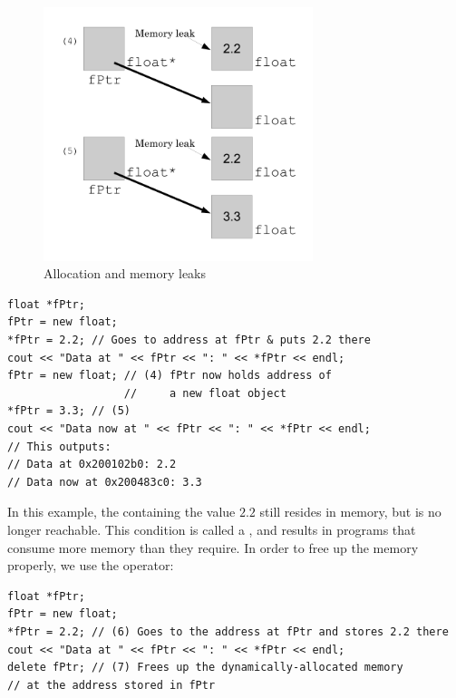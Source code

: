 \begin{figure}[tbh]
  \centering
  \includegraphics[width=0.7\textwidth]{diagrams/new_operator_diagram_2.pdf}
  \caption{Allocation and memory leaks} \label{fig:new_operator_diagram_2} 
\end{figure}

\noindent\begin{minipage}{\linewidth}\begin{lstlisting}
float *fPtr;
fPtr = new float;
*fPtr = 2.2; // Goes to address at fPtr & puts 2.2 there
cout << "Data at " << fPtr << ": " << *fPtr << endl;
fPtr = new float; // (4) fPtr now holds address of 
                  //     a new float object
*fPtr = 3.3; // (5)
cout << "Data now at " << fPtr << ": " << *fPtr << endl;
// This outputs: 
// Data at 0x200102b0: 2.2
// Data now at 0x200483c0: 3.3
\end{lstlisting}\end{minipage}

In this example, the  containing the value $2.2$ still resides in memory, but is no longer reachable. 
This condition is called a , and results in programs that consume more memory than they require. 
In order to free up the memory properly, we use the  operator: \nopagebreak[4]

\noindent\begin{minipage}{\linewidth}\begin{lstlisting}
float *fPtr;
fPtr = new float;
*fPtr = 2.2; // (6) Goes to the address at fPtr and stores 2.2 there
cout << "Data at " << fPtr << ": " << *fPtr << endl;
delete fPtr; // (7) Frees up the dynamically-allocated memory 
// at the address stored in fPtr
\end{lstlisting}\end{minipage}


